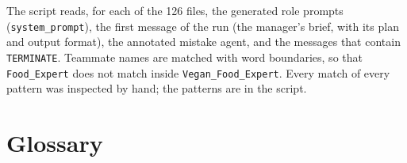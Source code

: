 \documentclass[10pt,a4paper]{article}
\newcommand{\code}[1]{\texttt{#1}}
\begin{document}
The script reads, for each of the 126 files, the generated role prompts
(\code{system_prompt}), the first message of the run (the manager's brief,
with its plan and output format), the annotated mistake agent, and the
messages that contain \code{TERMINATE}. Teammate names are matched with word
boundaries, so that \code{Food_Expert} does not match inside
\code{Vegan_Food_Expert}. Every match of every pattern was inspected by
hand; the patterns are in the script.

\section{Glossary}\label{app:glossary}
\end{document}
